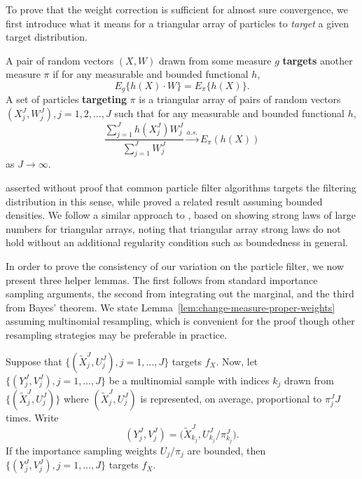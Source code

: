 To prove that the weight correction is sufficient for almost sure convergence, we first introduce what it means for a triangular array of particles to \textit{target} a given target distribution. 

\begin{defn}[Targeting]
    A pair of random vectors $(X, W)$ drawn from some measure $g$ \textbf{targets} another measure $\pi$ if for any measurable and bounded functional $h$,
\begin{equation}
    E_g\{h(X) \cdot W\}=E_\pi\{h(X)\}.
\end{equation}  
    A set of particles \textbf{targeting} $\pi$ is a triangular array of pairs of random vectors $(X^J_j, W^J_j), j=1,2, \ldots,J$ such that for any measurable and bounded functional $h$,
\begin{equation}
    \frac{\sum_{j=1}^J h(X^J_j) W^J_j}{\sum_{j=1}^J W^J_j} \stackrel{a.s.}{\to} E_\pi(h(X))
\end{equation}
as $J \to \infty$.
\end{defn}
\cite{chopin04} asserted without proof that common particle filter algorithms targets the filtering distribution in this sense, while \cite{chopin20} proved a related result assuming bounded densities.
We follow a similar approach to \cite{chopin20}, based on showing strong laws of large numbers for triangular arrays, noting that triangular array strong laws do not hold without an additional regularity condition such as boundedness in general.
 
In order to prove the consistency of our variation on the particle filter, we now present three helper lemmas.
The first follows from standard importance sampling arguments, the second from integrating out the marginal, and the third from Bayes' theorem. 
We state Lemma~\ref{lem:change-measure-proper-weights} assuming multinomial resampling, which is convenient for the proof though other resampling strategies may be preferable in practice.

\begin{lem}
    \label{lem:change-measure-proper-weights}
    Suppose that $\{(\tilde X_j^J,U_j^J),j=1,\dots,J\}$ targets $f_X$. Now, let $\{(Y_j^J,V_j^J),j=1,\dots,J\}$ be a multinomial sample with indices $k_j$ drawn from $\{(\tilde X_j^J,U_j^J)\}$ where $(\tilde X_j^J,U_j^J)$ is represented, on average, proportional to $\pi^J_j J$ times. Write
    \begin{equation}
    (Y_j^J,V_j^J) = \big(\tilde X^J_{k_j},U^J_{k_j}/\pi^J_{k_j}\big).
    \end{equation} 
    If the importance sampling weights $U_j/\pi_j$ are bounded, then $\{(Y^J_j,V^J_j),j=1,\dots,J\}$ targets $f_X$.
\end{lem}


